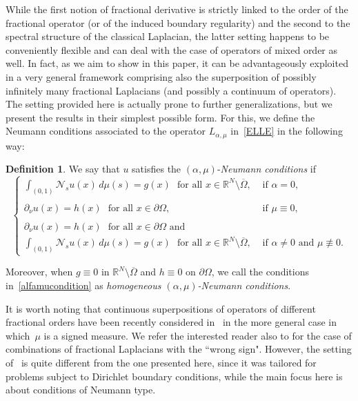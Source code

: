 \documentclass[12pt,a4paper,intlimits,sumlimits]{amsart}
\def \R {\mathbb{R}}
\def \Ns {\mathscr{N}_{s}}
\theoremstyle{definition}
\newtheorem{definition}{Definition}[section]
\theoremstyle{plain}
\numberwithin{equation}{section}
\begin{document}
While the first notion of fractional derivative is strictly linked to the order of the fractional operator (or of the induced boundary regularity)
and the second to the spectral structure of the classical Laplacian, the latter setting happens to be conveniently flexible and can deal with the case of operators of mixed order as well. In fact, as we aim to show in this paper, it can be advantageously exploited in a very general framework comprising also
the superposition of possibly infinitely many fractional Laplacians (and possibly a continuum of operators). The setting provided here is actually prone to further generalizations, but we present
the results in their simplest possible form. For this, we define the Neumann conditions associated to the operator $L_{\alpha, \mu}$ in~\eqref{ELLE} in the following way:
\begin{definition}\label{NDEFN}
We say that $u$ satisfies the $(\alpha,\mu)$-\textit{Neumann conditions} if
\begin{equation}\label{alfamucondition}
\begin{cases}
\displaystyle\int_{(0,1)} \Ns u(x)\,d\mu(s)=g(x)\,\, \mbox{ for all }x\in \R^N \setminus \overline{\Omega},    & \mbox{ if }\alpha=0,
\\ \\
\partial_\nu u(x)=h(x) \,\, \mbox{ for all } x\in \partial\Omega,
&  \mbox{ if } \mu\equiv 0,
\\ \\
\partial_\nu u(x)=h(x) \,\, \mbox{ for all } x\in \partial\Omega
 \mbox{ and } \\ 
 \displaystyle\int_{(0,1)} \Ns u(x)\,d\mu(s)=g(x)\,\, \mbox{ for all }x\in \R^N \setminus \overline{\Omega},  
 &\mbox{ if } \alpha\neq 0 \mbox{ and } \mu\not \equiv 0.
\end{cases}
\end{equation}

Moreover, when $g\equiv 0$ in $\R^N\setminus \overline{\Omega}$ 
and $h\equiv 0$ on $\partial \Omega$, we call the conditions in~\eqref{alfamucondition} as \textit{homogeneous $(\alpha,\mu)$-Neumann conditions}.
\end{definition}

It is worth noting that continuous superpositions of operators of different fractional orders have been recently considered in~\cite{MR4736013, DPSV-P, MR4821750}
in the more general case in which~$\mu$ is a signed measure.  We refer the interested reader also to \cite{MR4793906} for the case of combinations of fractional Laplacians with the ``wrong sign".
However,  the setting of~\cite{MR4736013, DPSV-P, MR4821750} is quite different from the one presented here, since it was tailored for problems subject to Dirichlet boundary conditions, while the main focus here is about conditions of Neumann type.
\end{document}
